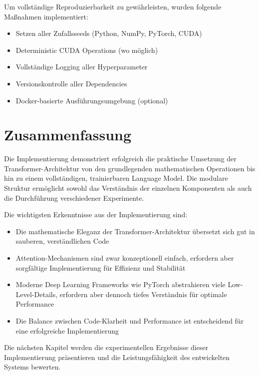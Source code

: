 Um vollständige Reproduzierbarkeit zu gewährleisten, wurden folgende Maßnahmen implementiert:
\begin{itemize}
    \item Setzen aller Zufallsseeds (Python, NumPy, PyTorch, CUDA)
    \item Deterministic CUDA Operations (wo möglich)
    \item Vollständige Logging aller Hyperparameter
    \item Versionskontrolle aller Dependencies
    \item Docker-basierte Ausführungsumgebung (optional)
\end{itemize}

\section{Zusammenfassung}

Die Implementierung demonstriert erfolgreich die praktische Umsetzung der Transformer-Architektur von den grundlegenden mathematischen Operationen bis hin zu einem vollständigen, trainierbaren Language Model. Die modulare Struktur ermöglicht sowohl das Verständnis der einzelnen Komponenten als auch die Durchführung verschiedener Experimente.

Die wichtigsten Erkenntnisse aus der Implementierung sind:
\begin{itemize}
    \item Die mathematische Eleganz der Transformer-Architektur übersetzt sich gut in sauberen, verständlichen Code
    \item Attention-Mechanismen sind zwar konzeptionell einfach, erfordern aber sorgfältige Implementierung für Effizienz und Stabilität
    \item Moderne Deep Learning Frameworks wie PyTorch abstrahieren viele Low-Level-Details, erfordern aber dennoch tiefes Verständnis für optimale Performance
    \item Die Balance zwischen Code-Klarheit und Performance ist entscheidend für eine erfolgreiche Implementierung
\end{itemize}

Die nächsten Kapitel werden die experimentellen Ergebnisse dieser Implementierung präsentieren und die Leistungsfähigkeit des entwickelten Systems bewerten.